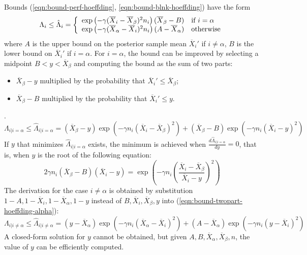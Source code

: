 \documentclass{article}
\begin{document}
Bounds (\ref{eqn:bound-perf-hoeffding}, \ref{eqn:bound-blnk-hoeffding}) have the form
\begin{equation}
  \Lambda_i \le \hat\Lambda_i=\left\{
  \begin{array}{l l}
    \exp\left(- \gamma(\overline X_i - \overline X_\beta)^2 n_i \right)(\overline X_\beta-B) & \mbox{{\rm if} $i=\alpha$} \\
    \exp\left(- \gamma(\overline X_\alpha - \overline X_i)^2 n_i \right)(A-\overline  X_\alpha)  &  \mbox{\rm otherwise}
  \end{array} \right.
\label{eqn:bound-generic-hoeffding}
\end{equation}
where $A$ is the upper bound on the posterior sample mean $\overline X_i'$ if $i\ne \alpha$, $B$ is the lower bound on $\overline X_i'$ if $i=\alpha$. For $i=\alpha$, the bound can be improved by selecting a midpoint
$B < y < \overline X_\beta$ and computing the bound as the sum of two parts:
\begin{itemize}
\item $\overline X_\beta-y$ multiplied by the probability that
  $\overline X_i' \le \overline X_\beta$;
\item $\overline X_\beta-B$ multiplied by the probability that $\overline X_i'\le
  y$.
\end{itemize}.
\begin{equation}
\Lambda_{i|i=\alpha} \le \hat \Lambda_{i|i=\alpha} =
 (\overline X_\beta-y)\exp\left(-\gamma n_i(\overline X_i-\overline X_\beta)^2\right)
 +(\overline X_\beta-B)\exp\left(-\gamma n_i(\overline X_i-y)^2\right)
\label{eqn:bound-twopart-hoeffding-alpha}
\end{equation}
If $y$ that minimizes $\hat\Lambda_{i|i=\alpha}$ exists, the minimum is achieved when
 $\frac {d\hat\Lambda_{i|i=\alpha}} {dy}=0$, that
is, when $y$ is the root of the following equation:
\begin{equation}
2\gamma n_i(\overline X_\beta-B)(\overline X_i-y)=\exp\left(-\gamma n_i\left(\frac {\overline X_i-\overline X_\beta}
    {\overline X_i-y}\right)^2\right)
\end{equation}
The derivation for the case $i\ne \alpha$ is obtained by substitution $1-A, 1-\overline X_i, 1-\overline X_\alpha, 1-y$ instead of
$B, \overline X_i, \overline X_\beta, y$ into (\ref{eqn:bound-twopart-hoeffding-alpha}):
\begin{equation}
\Lambda_{i|i\ne\alpha} \le \hat\Lambda_{i|i\ne\alpha} = (y-\overline X_\alpha)\exp\left(-\gamma n_i(\overline X_\alpha-\overline
  X_i)^2\right)+(A-\overline X_\alpha)\exp\left(-\gamma n_i(y-\overline X_i)^2\right)
\label{eqn:bound-twopart-hoeffding-rest}
\end{equation}
A closed-form solution for $y$ cannot be obtained, but given
$A, B, \overline X_\alpha, \overline X_\beta, n$, the value of $y$ can be efficiently
computed.



\end{document}
